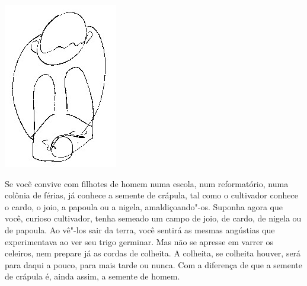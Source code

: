 \movetooddpage
\thispagestyle{empty}
\begin{vplace}[.25]


{\large{}}
\end{vplace}

\begin{center}
\vspace*{-4cm}\includegraphics[width=.5\textwidth]{./imgs/Image_1.jpg}{}
\end{center}

\vspace{2cm}
{}

\pagebreak
\thispagestyle{empty}

\movetooddpage


Se você convive com filhotes de homem numa escola, num reformatório,
numa colônia de férias, já conhece a semente de crápula, tal como o
cultivador conhece o cardo, o joio, a papoula ou a nigela,
amaldiçoando"-os. Suponha agora que você, curioso cultivador, tenha
semeado um campo de joio, de cardo, de nigela ou de papoula. Ao vê"-los
sair da terra, você sentirá as mesmas angústias que experimentava ao ver
seu trigo germinar. Mas não se apresse em varrer os celeiros, nem
prepare já as cordas de colheita. A colheita, se colheita houver, será
para daqui a pouco, para mais tarde ou nunca. Com a diferença de que a
semente de crápula é, ainda assim, a semente de homem.

